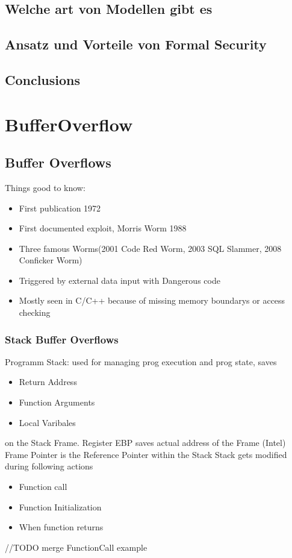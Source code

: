 \documentclass[a4paper, 12pt]{article}
\begin{document}
\subsection{Welche art von Modellen gibt es}
\subsection{Ansatz und Vorteile von Formal Security}
\subsection{Conclusions}

\section{BufferOverflow}
\subsection{Buffer Overflows}
Things good to know:
\begin{itemize}
\item First publication 1972
\item First documented exploit, Morris Worm 1988
\item Three famous Worms(2001 Code Red Worm, 2003 SQL Slammer, 2008 Conficker Worm)
\item Triggered by external data input with Dangerous code
\item Mostly seen in C/C++ because of missing memory boundarys or access checking
\end{itemize}
\subsubsection{Stack Buffer Overflows}
Programm Stack: used for managing prog execution and prog state, saves 
\begin{itemize}
\item Return Address
\item Function Arguments
\item Local Varibales
\end{itemize}
on the Stack Frame.
Register EBP saves actual address of the Frame (Intel)
Frame Pointer is the Reference Pointer within the Stack
Stack gets modified during following actions
\begin{itemize}
\item Function call
\item Function Initialization
\item When function returns
\end{itemize}
//TODO merge FunctionCall example
\end{document}

